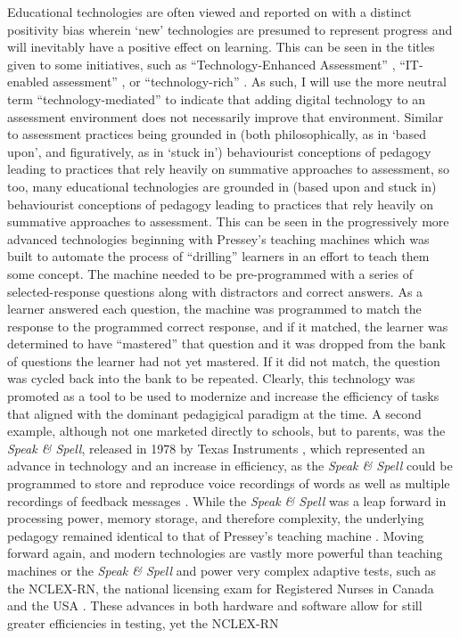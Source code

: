 \documentclass[
]{book}
\begin{document}
Educational technologies are often viewed and reported on with a distinct positivity bias \citep{irvineLandscapeMergingModalities2020} wherein `new' technologies are presumed to represent progress and will inevitably have a positive effect on learning. This can be seen in the titles given to some initiatives, such as ``Technology-Enhanced Assessment'' \citep{oldfieldAssessmentDigitalAge2012, timmisRethinkingAssessmentDigital2016}, ``IT-enabled assessment'' \citep{webbAssessmentTwentyFirstCentury2018}, or ``technology-rich'' \citep{linAssessingLearningTechnologyrich2020}. As such, I will use the more neutral term ``technology-mediated'' to indicate that adding digital technology to an assessment environment does not necessarily improve that environment. Similar to assessment practices being grounded in (both philosophically, as in `based upon', and figuratively, as in `stuck in') behaviourist conceptions of pedagogy leading to practices that rely heavily on summative approaches to assessment, so too, many educational technologies are grounded in (based upon and stuck in) behaviourist conceptions of pedagogy leading to practices that rely heavily on summative approaches to assessment. This can be seen in the progressively more advanced technologies beginning with Pressey's teaching machines \citep{benjaminHistoryTeachingMachines1988, presseyMachineAutomaticTeaching1927, wattersTeachingMachinesHistory2021} which was built to automate the process of ``drilling'' learners in an effort to teach them some concept. The machine needed to be pre-programmed with a series of selected-response questions along with distractors and correct answers. As a learner answered each question, the machine was programmed to match the response to the programmed correct response, and if it matched, the learner was determined to have ``mastered'' that question and it was dropped from the bank of questions the learner had not yet mastered. If it did not match, the question was cycled back into the bank to be repeated. Clearly, this technology was promoted as a tool to be used to modernize and increase the efficiency of tasks that aligned with the dominant pedagigical paradigm at the time. A second example, although not one marketed directly to schools, but to parents, was the \emph{Speak \& Spell}, released in 1978 by Texas Instruments \citep{braguinskiArchiveCommunicationInteractive2018, frantzSpeakSpell2014}, which represented an advance in technology and an increase in efficiency, as the \emph{Speak \& Spell} could be programmed to store and reproduce voice recordings of words as well as multiple recordings of feedback messages \citep{frantzSpeakSpell2014}. While the \emph{Speak \& Spell} was a leap forward in processing power, memory storage, and therefore complexity, the underlying pedagogy remained identical to that of Pressey's teaching machine \citep{wattersSpeakSpellHistory2015}. Moving forward again, and modern technologies are vastly more powerful than teaching machines or the \emph{Speak \& Spell} and power very complex adaptive tests, such as the NCLEX-RN, the national licensing exam for Registered Nurses in Canada and the USA \citep{smithglasgowStandardizedTestingNursing2019}. These advances in both hardware and software allow for still greater efficiencies in testing, yet the NCLEX-RN 
\end{document}
